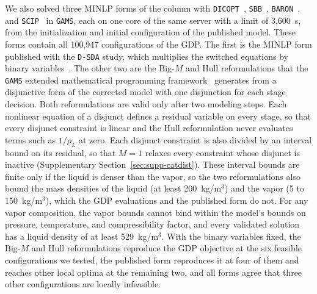 \documentclass{article}
\begin{document}
We also solved three MINLP forms of the column with \texttt{DICOPT}~\citep{viswanathan1990combined}, \texttt{SBB}~\citep{gamsSBB}, \texttt{BARON}~\citep{sahinidis1996baron}, and \texttt{SCIP}~\citep{bolusani2024scip} in \texttt{GAMS}, each on one core of the same server with a limit of 3,600~s, from the initialization and initial configuration of the published model.
These forms contain all 100,947 configurations of the GDP.
The first is the MINLP form published with the \texttt{D-SDA} study, which multiplies the switched equations by binary variables~\citep{linan2020optimalII}.
The other two are the Big-\(M\) and Hull reformulations that the \texttt{GAMS} extended mathematical programming framework~\citep{ferris2009emp} generates from a disjunctive form of the corrected model with one disjunction for each stage decision.
Both reformulations are valid only after two modeling steps.
Each nonlinear equation of a disjunct defines a residual variable on every stage, so that every disjunct constraint is linear and the Hull reformulation never evaluates terms such as \(1/\rho_L\) at zero.
Each disjunct constraint is also divided by an interval bound on its residual, so that \(M=1\) relaxes every constraint whose disjunct is inactive (Supplementary Section~\ref{sec:supp-catdist}).
These interval bounds are finite only if the liquid is denser than the vapor, so the two reformulations also bound the mass densities of the liquid (at least 200~kg/m\(^3\)) and the vapor (5 to 150~kg/m\(^3\)), which the GDP evaluations and the published form do not.
For any vapor composition, the vapor bounds cannot bind within the model's bounds on pressure, temperature, and compressibility factor, and every validated solution has a liquid density of at least 529~kg/m\(^3\).
With the binary variables fixed, the Big-\(M\) and Hull reformulations reproduce the GDP objective at the six feasible configurations we tested, the published form reproduces it at four of them and reaches other local optima at the remaining two, and all forms agree that three other configurations are locally infeasible.
\end{document}
